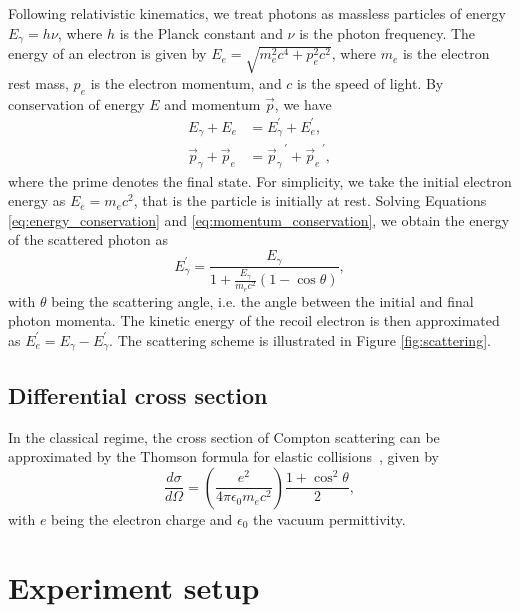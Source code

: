 \documentclass[aps,twocolumn,secnumarabic,balancelastpage,amsmath,amssymb,nofootinbib,floatfix]{revtex4-1}
\begin{document}
Following relativistic kinematics, we treat photons as massless particles of energy $E_\gamma = h \nu$, where $h$ is the Planck constant and $\nu$ is the photon frequency. The energy of an electron is given by $E_e = \sqrt{m_e^2 c^4 + p_e^2 c^2}$, where $m_e$ is the electron rest mass, $p_e$ is the electron momentum, and $c$ is the speed of light. By conservation of energy $E$ and momentum $\vec{p}$, we have
\begin{align}
    \label{eq:energy_conservation}
    E_\gamma + E_e &= E_\gamma^{\prime} + E_e^{\prime}, \\
    \label{eq:momentum_conservation}
    \vec{p}_\gamma + \vec{p}_e &= {\vec{p}_\gamma}^{\,\prime} + {\vec{p}_e}^{\,\prime},
\end{align}
where the prime denotes the final state. For simplicity, we take the initial electron energy as $E_e = m_e c^2$, that is the particle is initially at rest. Solving Equations \eqref{eq:energy_conservation} and \eqref{eq:momentum_conservation}, we obtain the energy of the scattered photon as
\begin{equation}
    \label{eq:scattered_photon_energy}
    E_\gamma^{\prime} = \frac{E_\gamma}{1 + \frac{E_\gamma}{m_e c^2} (1 - \cos \theta)},
\end{equation}
with $\theta$ being the scattering angle, i.e. the angle between the initial and final photon momenta. The kinetic energy of the recoil electron is then approximated as $E_e^{\prime} = E_\gamma - E_\gamma^{\prime}$. The scattering scheme is illustrated in Figure \ref{fig:scattering}.


\subsection{Differential cross section}
\label{ssec:differential_cross_section}

In the classical regime, the cross section of Compton scattering can be approximated by the Thomson formula for elastic collisions~\citep{Jackson1975}, given by
\begin{equation}
    \label{eq:thomson_cross_section}
    \frac{d\sigma}{d\Omega} = \left( \frac{e^2}{4 \pi \epsilon_0 m_e c^2} \right) \frac{1 + \cos^2{\theta}}{2},
\end{equation}
with $e$ being the electron charge and $\epsilon_0$ the vacuum permittivity.


\section{Experiment setup}
\label{sec:experiment}
\end{document}

